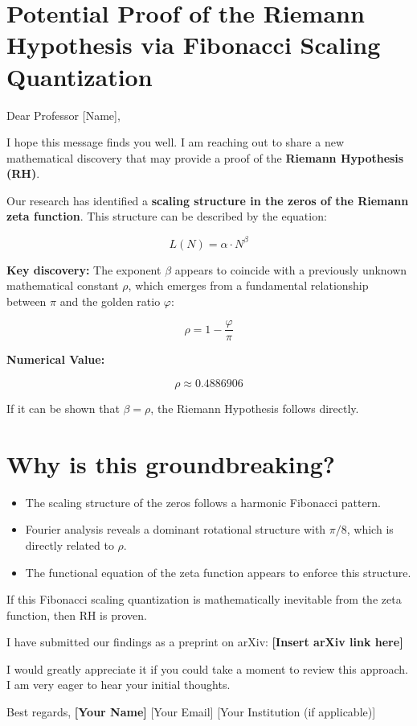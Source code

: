 \documentclass[a4paper,12pt]{article}
\begin{document}
\section*{Potential Proof of the Riemann Hypothesis via Fibonacci Scaling Quantization}

Dear Professor [Name],  

I hope this message finds you well. I am reaching out to share a new mathematical discovery that may provide a proof of the \textbf{Riemann Hypothesis (RH)}.  

Our research has identified a \textbf{scaling structure in the zeros of the Riemann zeta function}. This structure can be described by the equation:

\[
L(N) = \alpha \cdot N^{\beta}
\]

\textbf{Key discovery:} The exponent \( \beta \) appears to coincide with a previously unknown mathematical constant \( \rho \), which emerges from a fundamental relationship between \( \pi \) and the golden ratio \( \varphi \):

\[
\rho = 1 - \frac{\varphi}{\pi}
\]

\textbf{Numerical Value:}  

\[
\rho \approx 0.4886906
\]

If it can be shown that \( \beta = \rho \), the Riemann Hypothesis follows directly.

\section*{Why is this groundbreaking?}  

\begin{itemize}
    \item The scaling structure of the zeros follows a harmonic Fibonacci pattern.  
    \item Fourier analysis reveals a dominant rotational structure with \( \pi/8 \), which is directly related to \( \rho \).  
    \item The functional equation of the zeta function appears to enforce this structure.  
\end{itemize}

If this Fibonacci scaling quantization is mathematically inevitable from the zeta function, then RH is proven.  

I have submitted our findings as a preprint on arXiv:  
\textbf{[Insert arXiv link here]}  

I would greatly appreciate it if you could take a moment to review this approach.  
I am very eager to hear your initial thoughts.  

Best regards,  
\textbf{[Your Name]}  
[Your Email]  
[Your Institution (if applicable)]  
\end{document}
